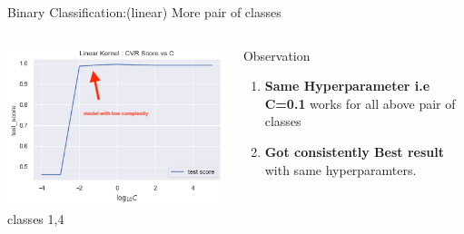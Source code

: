 \documentclass[12pt,t]{beamer}
\begin{document}
\begin{frame}[t]{Binary Classification:(linear) More pair of classes}
\begin{columns}
    \begin{column}[]{0.25\linewidth}
        \includegraphics[width=\linewidth]{images/p1a/2(binary clf)/classes1and4_libsvm_linear25f.png}
        classes 1,4
    \end{column}
    \begin{column}[]{0.75\linewidth}
        \begin{block}{Observation}
            \begin{enumerate}
                \item \textbf{Same Hyperparameter i.e C=0.1} works for all above pair of classes
                \item \textbf{Got consistently Best result} with same hyperparamters.
            \end{enumerate}
        \end{block}
    \end{column}
\end{columns}
    

\end{frame}
\end{document}

